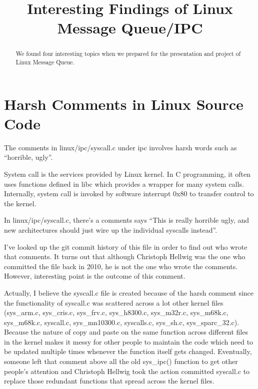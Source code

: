 \documentclass[10pt,preprint]{sigplanconf}
\date{}
\begin{document}
\title{Interesting Findings of Linux Message Queue/IPC} 
\maketitle

\begin{abstract}

We found four interesting topics when we prepared for the presentation and project of Linux Message Queue.

\end{abstract}

\section{Harsh Comments in Linux Source Code}

The comments in linux/ipc/syscall.c under ipc involves harsh words such as “horrible, ugly”.

System call is the services provided by Linux kernel. In C programming, it often uses functions defined in libc which provides a wrapper for many system calls. Internally, system call is invoked by software interrupt 0x80 to transfer control to the kernel. 

In linux/ipc/syscall.c, there’s a comments says “This is really horrible ugly, and new architectures should just wire up the individual syscalls instead”.

I’ve looked up the git commit history of this file in order to find out who wrote that comments. It turns out that although Christoph Hellwig was the one who committed the file back in 2010, he is not the one who wrote the comments. However, interesting point is the outcome of this comment.

Actually, I believe the syscall.c file is created because of the harsh comment since the functionality of syscall.c was scattered across a lot other kernel files (sys\_arm.c, sys\_cris.c,  sys\_frv.c, sys\_h8300.c, sys\_m32r.c, sys\_m68k.c, sys\_m68k.c, syscall.c, sys\_mn10300.c, syscalls.c, sys\_sh.c, sys\_sparc\_32.c). Because the nature of copy and paste on the same function across different files in the kernel makes it messy for other people to maintain the code which need to be updated multiple times whenever the function itself gets changed. Eventually, someone left that comment above all the old sys\_ipc() function to get other people’s attention and Christoph Hellwig took the action committed syscall.c to replace those redundant functions that spread across the kernel files.
\end{document}
